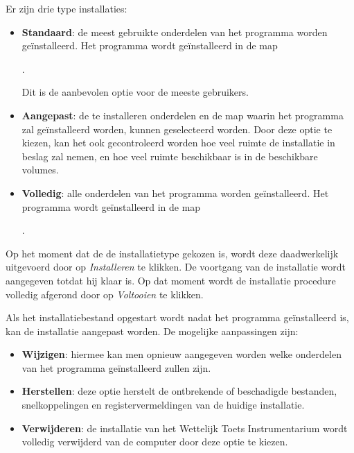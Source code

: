 Er zijn drie type installaties:
\begin{itemize}
	\item \textbf{Standaard}: de meest gebruikte onderdelen van het programma worden ge\"installeerd. Het programma wordt ge\"installeerd in de map
		
		.
		
		Dit is de aanbevolen optie voor de meeste gebruikers.
	\item \textbf{Aangepast}: de te installeren onderdelen en de map waarin het programma zal ge\"installeerd worden, kunnen geselecteerd worden. Door deze optie te kiezen, kan het ook gecontroleerd worden hoe veel ruimte de installatie in beslag zal nemen, en hoe veel ruimte beschikbaar is in de beschikbare volumes.
	\item \textbf{Volledig}: alle onderdelen van het programma worden ge\"installeerd. Het programma wordt ge\"installeerd in de map
		
		.
\end{itemize}

Op het moment dat de de installatietype gekozen is, wordt deze daadwerkelijk uitgevoerd door op \textit{Installeren} te klikken. De voortgang van de installatie wordt aangegeven totdat hij klaar is. Op dat moment wordt de installatie procedure volledig afgerond door op \textit{Voltooien}  te klikken.


Als het installatiebestand opgestart wordt nadat het programma ge\"installeerd is, kan de installatie aangepast worden. De mogelijke aanpassingen zijn:
\begin{itemize}
	\item \textbf{Wijzigen}: hiermee kan men opnieuw aangegeven worden welke onderdelen van het programma ge\"installeerd zullen zijn. 
	\item \textbf{Herstellen}: deze optie herstelt de ontbrekende of beschadigde bestanden, snelkoppelingen en registervermeldingen van de huidige installatie.
	\item \textbf{Verwijderen}: de installatie van het Wettelijk Toets Instrumentarium wordt volledig verwijderd van de computer door deze optie te kiezen.
\end{itemize}

